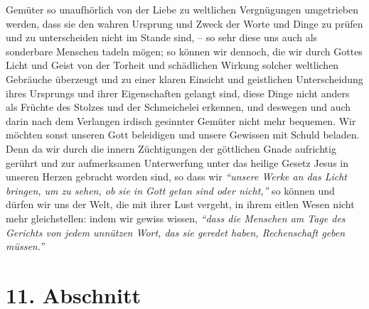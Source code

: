 Gemüter so unaufhörlich von der Liebe zu weltlichen Vergnügungen umgetrieben
werden, dass sie den wahren Ursprung und Zweck der Worte und Dinge zu prüfen und
zu unterscheiden nicht im Stande sind, -- so sehr diese uns auch als sonderbare
Menschen tadeln mögen; so können wir dennoch, die wir durch Gottes Licht und
Geist von der Torheit und schädlichen Wirkung solcher weltlichen Gebräuche
überzeugt und zu einer klaren Einsicht und geistlichen Unterscheidung ihres
Ursprungs und ihrer Eigenschaften gelangt sind, diese Dinge nicht anders als
Früchte des Stolzes und der Schmeichelei erkennen, und deswegen und auch darin
nach dem Verlangen irdisch gesinnter Gemüter nicht mehr bequemen. Wir möchten
sonst unseren Gott beleidigen und unsere Gewissen mit Schuld beladen. Denn da
wir durch die innern Züchtigungen der göttlichen
Gnade aufrichtig gerührt und zur
aufmerksamen Unterwerfung unter das heilige Gesetz Jesus in unseren
Herzen
gebracht worden sind, so dass wir
\textit{"`unsere Werke an das Licht bringen, um zu
sehen, ob sie in Gott getan sind oder nicht,"'}
so können und dürfen wir uns der Welt, die mit ihrer Lust vergeht, in ihrem
eitlen
Wesen nicht mehr gleichstellen: indem wir gewiss wissen,
\textit{"`dass die Menschen am
Tage des Gerichts von jedem unnützen Wort, das sie geredet haben, Rechenschaft
geben müssen."'}

\section{11. Abschnitt} \label{kap10_ab11}

